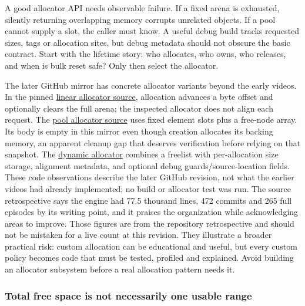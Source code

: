 A good allocator API needs observable failure. If a fixed arena is exhausted, silently returning overlapping memory corrupts unrelated objects. If a pool cannot supply a slot, the caller must know. A useful debug build tracks requested sizes, tags or allocation sites, but debug metadata should not obscure the basic contract. Start with the lifetime story: who allocates, who owns, who releases, and when is bulk reset safe? Only then select the allocator.

The later GitHub mirror has concrete allocator variants beyond the early videos. In the pinned \href{https://github.com/travisvroman/kohi/blob/05a5193d5ed4890703cfcbbeb5c5e947feefecf6/kohi.core/src/memory/allocators/linear_allocator.c}{linear allocator source}, allocation advances a byte offset and  optionally clears the full arena; the inspected allocator does not align each request. The \href{https://github.com/travisvroman/kohi/blob/05a5193d5ed4890703cfcbbeb5c5e947feefecf6/kohi.core/src/memory/allocators/pool_allocator.c}{pool allocator source} uses fixed element slots plus a free-node array. Its  body is empty in this mirror even though creation allocates its backing memory, an apparent cleanup gap that deserves verification before relying on that snapshot. The \href{https://github.com/travisvroman/kohi/blob/05a5193d5ed4890703cfcbbeb5c5e947feefecf6/kohi.core/src/memory/allocators/dynamic_allocator.c}{dynamic allocator} combines a freelist with per-allocation size storage, alignment metadata, and optional debug guards/source-location fields. These code observations describe the later GitHub revision, not what the earlier videos had already implemented; no build or allocator test was run. The source retrospective says the engine had 77.5 thousand lines, 472 commits and 265 full episodes by its writing point, and it praises the organization while acknowledging areas to improve. Those figures are from the repository retrospective and should not be mistaken for a live count at this revision. They illustrate a broader practical risk: custom allocation can be educational and useful, but every custom policy becomes code that must be tested, profiled and explained. Avoid building an allocator subsystem before a real allocation pattern needs it.

\subsubsection{Total free space is not necessarily one usable range}\label{05-engine-i-ch014-total-free-space-is-not-necessarily-one-usable-range}

